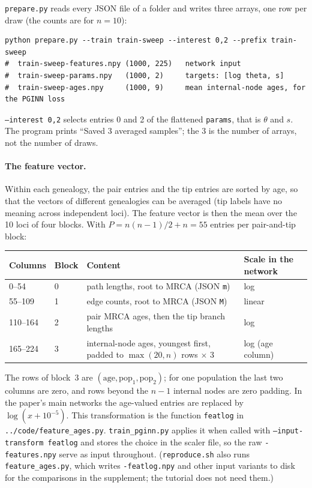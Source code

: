 \documentclass[11pt]{article}
\newcommand{\file}[1]{\texttt{#1}}
\begin{document}
\file{prepare.py} reads every JSON file of a folder and writes three
arrays, one row per draw (the counts are for $n{=}10$):
\begin{lstlisting}
python prepare.py --train train-sweep --interest 0,2 --prefix train-sweep
#  train-sweep-features.npy (1000, 225)   network input
#  train-sweep-params.npy   (1000, 2)     targets: [log theta, s]
#  train-sweep-ages.npy     (1000, 9)     mean internal-node ages, for the PGINN loss
\end{lstlisting}
\texttt{--interest 0,2} selects entries 0 and 2 of the flattened
\texttt{params}, that is $\theta$ and $s$.
The program prints ``Saved 3 averaged samples''; the 3 is the number of
arrays, not the number of draws.

\paragraph{The feature vector.}
Within each genealogy, the pair entries and the tip entries are sorted
by age, so that the vectors of different genealogies can be averaged
(tip labels have no meaning across independent loci).
The feature vector is then the mean over the 10 loci of four blocks.
With $P{=}n(n{-}1)/2+n{=}55$ entries per pair-and-tip block:
\begin{center}
\small
\begin{tabular}{@{}llll@{}}
\toprule
Columns & Block & Content & Scale in the network \\
\midrule
0--54    & 0 & path lengths, root to MRCA (JSON \texttt{m}) & log \\
55--109  & 1 & edge counts, root to MRCA (JSON \texttt{M}) & linear \\
110--164 & 2 & pair MRCA ages, then the tip branch lengths & log \\
165--224 & 3 & internal-node ages, youngest first, padded to $\max(20,n)$ rows $\times$ 3 & log (age column) \\
\bottomrule
\end{tabular}
\end{center}
The rows of block~3 are $(\text{age},\text{pop}_1,\text{pop}_2)$; for one
population the last two columns are zero, and rows beyond the $n{-}1$
internal nodes are zero padding.
In the paper's main networks the age-valued entries are replaced by
$\log(x+10^{-5})$. This transformation is the function \texttt{featlog}
in \file{../code/feature\_ages.py}.
\file{train\_pginn.py} applies it when called with
\texttt{--input-transform featlog} and stores the choice in the scaler
file, so the raw \file{-features.npy} serve as input throughout.
(\file{reproduce.sh} also runs \file{feature\_ages.py}, which writes
\file{-featlog.npy} and other input variants to disk for the comparisons
in the supplement; the tutorial does not need them.)
\end{document}
